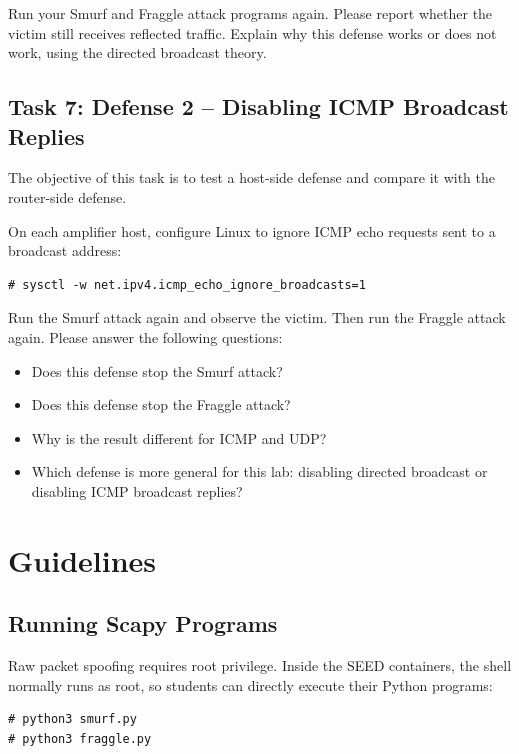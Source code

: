 Run your Smurf and Fraggle attack programs again. Please report whether the
victim still receives reflected traffic. Explain why this defense works or does
not work, using the directed broadcast theory.


\subsection{Task 7: Defense 2 -- Disabling ICMP Broadcast Replies}

The objective of this task is to test a host-side defense and compare it with
the router-side defense.

On each amplifier host, configure Linux to ignore ICMP echo requests sent to a
broadcast address:

\begin{lstlisting}
# sysctl -w net.ipv4.icmp_echo_ignore_broadcasts=1
\end{lstlisting}

Run the Smurf attack again and observe the victim. Then run the Fraggle attack
again. Please answer the following questions:

\begin{itemize}[noitemsep]
\item Does this defense stop the Smurf attack?
\item Does this defense stop the Fraggle attack?
\item Why is the result different for ICMP and UDP?
\item Which defense is more general for this lab: disabling directed broadcast
      or disabling ICMP broadcast replies?
\end{itemize}


\section{Guidelines}

\subsection{Running Scapy Programs}

Raw packet spoofing requires root privilege. Inside the SEED containers, the
shell normally runs as root, so students can directly execute their Python
programs:

\begin{lstlisting}
# python3 smurf.py
# python3 fraggle.py
\end{lstlisting}

